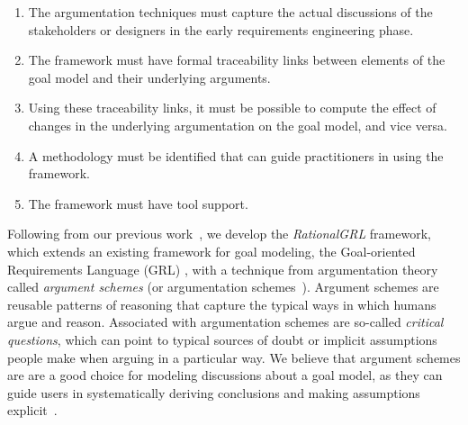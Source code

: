 \begin{enumerate}
\item 
The argumentation techniques must capture the actual discussions of the stakeholders or designers in the early requirements engineering phase.
\item 
The framework must have formal traceability links between elements of the goal model and their underlying arguments.
\item 
Using these traceability links, it must be possible to compute the effect of changes in the underlying argumentation on the goal model, and vice versa.
\item 
A methodology must be identified that can guide practitioners in using the framework.
\item 
The framework must have tool support. %
\end{enumerate}





Following from our previous work~\cite{vanzee-etal:renext2015,vanZee-etal:er2016}, we develop the \emph{RationalGRL} framework, which extends an existing framework for goal modeling, the Goal-oriented Requirements Language (GRL) \cite{Amyot:2010:EGM:1841349.1841356}, with a technique from argumentation theory called \emph{argument schemes} (or argumentation schemes~\cite{walton-etal2008}). Argument schemes are reusable patterns of reasoning that capture the typical ways in which humans argue and reason. Associated with argumentation schemes are so-called \emph{critical questions}, which can point to typical sources of doubt or implicit assumptions people make when arguing in a particular way. We believe that argument schemes are are a good choice for modeling discussions about a goal model, as they can guide users in systematically deriving conclusions and making assumptions explicit~\cite{bexEtal2003,murukannaiah2015}. 

